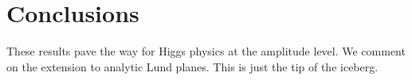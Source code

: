 \section{Conclusions}\label{sec:conclusions}

These results pave the way for Higgs physics at the amplitude level. We
comment on the extension to analytic Lund planes. This is just the tip
of the iceberg.

